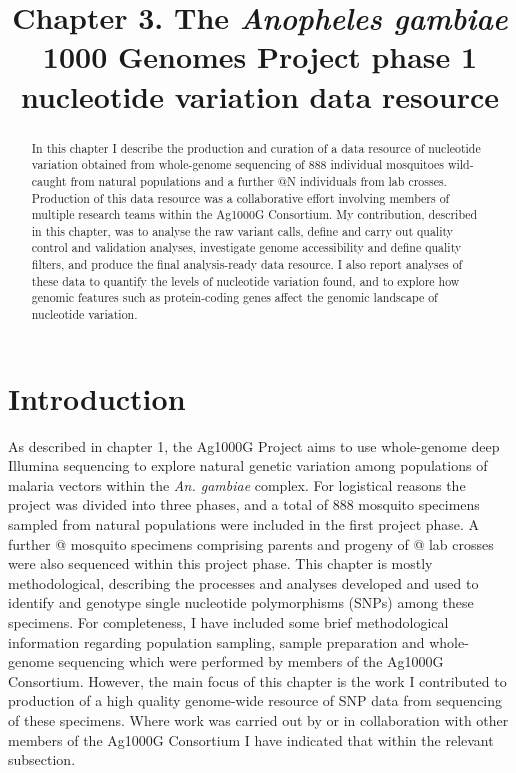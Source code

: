 \documentclass[a4paper,11pt,abstracton,hidelinks]{scrartcl}
\title{
Chapter 3. The \textit{Anopheles gambiae} 1000 Genomes Project phase 1 nucleotide variation data resource
}
\author{}
\begin{document}
\renewcommand{\abstractname}{Summary}


\maketitle



\begin{abstract}


In this chapter I describe the production and curation of a data resource of nucleotide variation obtained from whole-genome sequencing of 888 individual mosquitoes wild-caught from natural populations and a further @N individuals from lab crosses.
%
Production of this data resource was a collaborative effort involving members of multiple research teams within the Ag1000G Consortium.
%
My contribution, described in this chapter, was to analyse the raw variant calls, define and carry out quality control and validation analyses, investigate genome accessibility and define quality filters, and produce the final analysis-ready data resource.
%
I also report analyses of these data to quantify the levels of nucleotide variation found, and to explore how genomic features such as protein-coding genes affect the genomic landscape of nucleotide variation.


\end{abstract}


\tableofcontents


\section{Introduction}


As described in chapter 1, the Ag1000G Project aims to use whole-genome deep Illumina sequencing to explore natural genetic variation among populations of malaria vectors within the \textit{An. gambiae} complex.
%
For logistical reasons the project was divided into three phases, and a total of 888 mosquito specimens sampled from natural populations were included in the first project phase.
%
A further @ mosquito specimens comprising parents and progeny of @ lab crosses were also sequenced within this project phase.
%
This chapter is mostly methodological, describing the processes and analyses developed and used to identify and genotype single nucleotide polymorphisms (SNPs) among these specimens.
%
For completeness, I have included some brief methodological information regarding population sampling, sample preparation and whole-genome sequencing which were performed by members of the Ag1000G Consortium.
%
However, the main focus of this chapter is the work I contributed to production of a high quality genome-wide resource of SNP data from sequencing of these specimens.
%
Where work was carried out by or in collaboration with other members of the Ag1000G Consortium I have indicated that within the relevant subsection.
\end{document}
